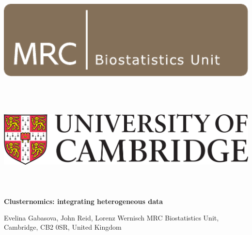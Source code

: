 \documentclass[t, final]{beamer}
\begin{document}
\begin{frame}{}

%
\begin{block}{
  \vspace{24pt}

  \includegraphics[height=150pt]{Figures/BSU}
  \hfill
  \includegraphics[height=150pt]{Figures/UniCam}

  \vspace{24pt}
}
  \vspace{24pt}

  \begin{center}
    \fontsize{82pt}{82pt}\selectfont \textcolor{mrcblue}{\textbf{Clusternomics: integrating heterogeneous data}}
  \end{center}

  \vspace{24pt}

  \fontsize{36pt}{36pt}\selectfont
  \textcolor{mrcblue}{
    Evelina Gabasova,
    John Reid,
    Lorenz Wernisch
    \hfill
    MRC Biostatistics Unit,
    Cambridge,
    CB2 0SR,
    United Kingdom}
\end{block}


%



\end{frame}
\end{document}
